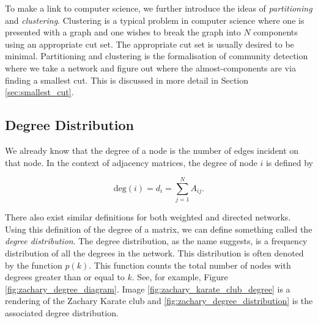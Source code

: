 To make a link to computer science, we further introduce the ideas of \emph{partitioning} and \emph{clustering}. Clustering is a typical problem in computer science where one is presented with a graph and one wishes to break the graph into $N$ components using an appropriate cut set. The appropriate cut set is usually desired to be minimal. Partitioning and clustering is the formalisation of community detection where we take a network and figure out where the almost-components are via finding a smallest cut. This is discussed in more detail in Section \ref{sec:smallest_cut}.

\newpage
\subsection{Degree Distribution}\label{sec:Degree Distribution}
We already know that the degree of a node is the number of edges incident on that node. In the context of adjacency matrices, the degree of node $i$ is defined by 

$$
\text{deg}(i) = d_i = \sum_{j=1}^NA_{ij}.
$$

There also exist similar definitions for both weighted and directed networks. Using this definition of the degree of a matrix, we can define something called the \emph{degree distribution}. The degree distribution, as the name suggests, is a frequency distribution of all the degrees in the network. This distribution is often denoted by the function $p(k)$. This function counts the total number of nodes with degrees greater than or equal to $k$. See, for example, Figure \ref{fig:zachary_degree_diagram}. Image \ref{fig:zachary_karate_club_degree} is a rendering of the Zachary Karate club and \ref{fig:zachary_degree_distribution} is the associated degree distribution.

